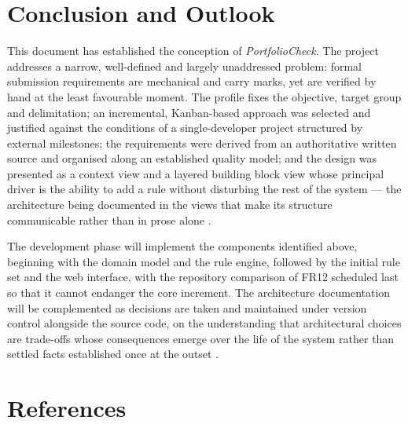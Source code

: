 \documentclass[a4paper,11pt]{article}
\begin{document}
\section{Conclusion and Outlook}\label{sec:conclusion}

This document has established the conception of \textit{PortfolioCheck}. The
project addresses a narrow, well-defined and largely unaddressed problem: formal
submission requirements are mechanical and carry marks, yet are verified by hand
at the least favourable moment. The profile fixes the objective, target group
and delimitation; an incremental, Kanban-based approach was selected and
justified against the conditions of a single-developer project structured by
external milestones; the requirements were derived from an authoritative written
source and organised along an established quality model; and the design was
presented as a context view and a layered building block view whose principal
driver is the ability to add a rule without disturbing the rest of the system
--- the architecture being documented in the views that make its structure
communicable rather than in prose alone \citep{Bass2021}.

The development phase will implement the components identified above, beginning
with the domain model and the rule engine, followed by the initial rule set and
the web interface, with the repository comparison of FR12 scheduled last so that
it cannot endanger the core increment. The architecture documentation will be
complemented as decisions are taken and maintained under version control
alongside the source code, on the understanding that architectural choices are
trade-offs whose consequences emerge over the life of the system rather than
settled facts established once at the outset \citep{Ford2021}.

\newpage

\section*{References}
\end{document}
